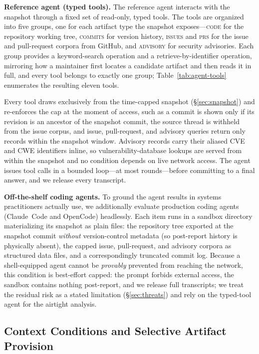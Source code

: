 \textbf{Reference agent (typed tools).} The reference agent interacts with the
snapshot through a fixed set of read-only, typed tools. The tools are organized
into five groups, one for each artifact type the snapshot exposes---\textsc{code} for the
repository working tree, \textsc{commits} for version history, \textsc{issues}
and \textsc{prs} for the issue and pull-request corpora from GitHub, and \textsc{advisory}
for security advisories. Each group provides a keyword-search operation and a
retrieve-by-identifier operation, mirroring how a maintainer first locates a
candidate artifact and then reads it in full, and every tool belongs to exactly
one group; Table~\ref{tab:agent-tools} enumerates the resulting eleven tools.

Every tool draws exclusively from the time-capped snapshot
(\S\ref{sec:snapshot}) and re-enforces the cap at the moment of access, such as
a commit is shown only if its revision is an
ancestor of the snapshot commit, the source thread is withheld from the issue
corpus, and issue, pull-request, and advisory queries return only records within
the snapshot window. Advisory records carry their aliased CVE and CWE
identifiers inline, so vulnerability-database lookups are served from within the
snapshot and no condition depends on live network access. The agent issues tool
calls in a bounded loop---at most  rounds---before committing to a final
answer, and we release every transcript.



\textbf{Off-the-shelf coding agents.} To ground the agent results in systems
practitioners actually use, we additionally evaluate production coding agents
(Claude~Code and OpenCode) headlessly. Each item runs in a sandbox directory
materializing its snapshot as plain files: the repository tree exported at the
snapshot commit \emph{without} version-control metadata (so post-report history
is physically absent), the capped issue, pull-request, and advisory corpora as
structured data files, and a correspondingly truncated commit log. Because a
shell-equipped agent cannot be \emph{provably} prevented from reaching the
network, this condition is best-effort capped: the prompt forbids external
access, the sandbox contains nothing post-report, and we release full
transcripts; we treat the residual risk as a stated limitation
(\S\ref{sec:threats}) and rely on the typed-tool agent for the airtight
analysis.

\subsection{Context Conditions and Selective Artifact Provision}
\label{sec:conditions}

